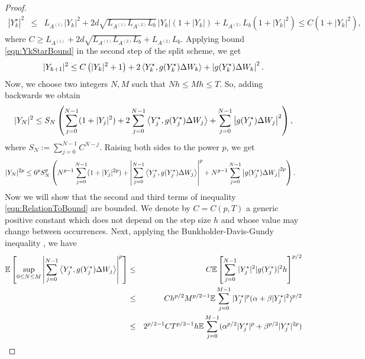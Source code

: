 \begin{proof}
\begin{eqnarray*}\label{eqn:YkStarBound}
	|Y_k^{\star}|^2
	&\leq&	L_{A^{(1)}} |Y_k|^2
	+ 2 d \sqrt{L_{A^{(1)}} L_{A^{(2)}} L_b }\,|Y_k|(1+|Y_k|)
	+L_{A^{(2)}} L_b (1+|Y_k|^2)		
	\leq C(1+|Y_k|^2),
\end{eqnarray*}
where $C\geq L_{A^{(1)}}+ 2 d \sqrt{L_{A^{(1)}} L_{A^{(2)}} L_b} + 
L_{A^{(2)}} L_b$. Applying  bound \eqref{eqn:YkStarBound} 
in the  second step of the split scheme, we get
\begin{equation*}
	|Y_{k+1}|^2
	\leq
	C \left(
	|Y_k|^2 + 1
	\right)
	+ 2\left\langle Y^{\star}_k, g(Y^{\star}_k) \Delta W_k\right\rangle
	+ \left|g(Y^{\star}_k) \Delta W_k \right|^2.
\end{equation*}
Now, we choose two integers $N,M$ such that $Nh\leq Mh \leq T$. So, adding 
backwards we obtain
\begin{equation*}
	|Y_N|^2
	\leq
	S_N\left(
	\sum_{j=0}^{N-1}
	(1+|Y_j|^2)
	+
	2\sum_{j=0}^{N-1}
	\left\langle Y_j^{\star}, g(Y_j^{\star}) \Delta W_j\right\rangle
	+
	\sum_{j=0}^{N-1}
	\left|
	g(Y_j^{\star}) \Delta W_j
	\right|^2
	\right),
\end{equation*}
where	$S_N:=	\sum_{j=0}^{N-1}C^{N-j}$. Raising both sides to the 
power $p$,  we get
\begin{align}\label{eqn:RelationToBound}
	|Y_N|^{2p}	
	&\leq
	6^{p} S_N^p
	\left(
	N^{p-1}
	\sum_{j=0}^{N-1}
	(1+|Y_j|^{2p})	
	+
	\left|
	\sum_{j=0}^{N-1}
	\left\langle Y_j^{\star}, g(Y_j^{\star}) \Delta W_j\right\rangle
	\right|^p
	+
	N^{p-1}
	\sum_{j=0}^{N-1}
	\left|
	g(Y_j^{\star}) \Delta W_j
	\right|^{2 p}				
	\right).
\end{align}
Now we will show that the second and third terms of inequality \eqref{eqn:RelationToBound} are bounded.
We denote by $C=C(p,T)$ a generic positive constant which does not depend on  the step size $h$ and whose
value may change between occurrences.	Next, applying the Bunkholder-Davis-Gundy
inequality  \cite{Mao2007}, we have
\begin{eqnarray}\label{eqn:BoundSecondTerm}
\m
\left[
\sup_{0\leq N \leq M}
\left|
\sum_{j=0}^{N-1}
\innerprod{Y_j^{\star}}{g(Y_j^{\star})\Delta W_j}
\right|^{p}
\right]
&\leq&
C\m
\left[
\sum_{j=0}^{N-1}
|Y_j^{\star}|^2
|g(Y_j^{\star})|^2
h
\right]^{p/2}
\notag\\
&\leq&
C h^{p/2}M^{p/2-1}
\m
\sum_{j=0}^{M-1}
|Y_j^{\star}|^p (\alpha +\beta |Y_j^{\star}|^2)^{p/2}
\notag\\
&\leq&
2^{p/2-1}C T^{p/2-1} h  
\m
\sum_{j=0}^{M-1}
(\alpha^{p/2}|Y_j^{\star}|^p +\beta^{p/2} |Y_j^{\star}|^{2p})
\notag\\

\end{eqnarray}
\end{proof}
